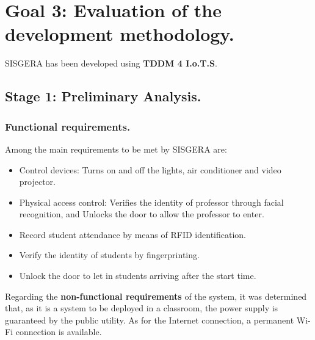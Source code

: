 \documentclass[]{scrartcl}
\begin{document}
\section*{Goal 3: Evaluation of the development methodology.}
	
	SISGERA has been developed using \textbf{TDDM 4 I.o.T.S}.
	
	\subsection*{Stage 1: Preliminary Analysis.}
		\subsubsection*{Functional requirements.} 
		Among the main requirements to be met by SISGERA are:
		\begin{itemize}
			\item Control devices: Turns on and off the lights, air conditioner and video projector.
			\item Physical access control: Verifies the identity of professor through facial recognition, and Unlocks the door to allow the professor to enter.
			\item Record student attendance by means of RFID identification.
			\item Verify the identity of students by fingerprinting.
			\item Unlock the door to let in students arriving after the start time.
		\end{itemize}
		
		Regarding the \textbf{non-functional requirements} of the system, it was determined that, as it is a system to be deployed in a classroom, the power supply is guaranteed by the public utility. As for the Internet connection, a permanent Wi-Fi connection is available.
	
\end{document}
